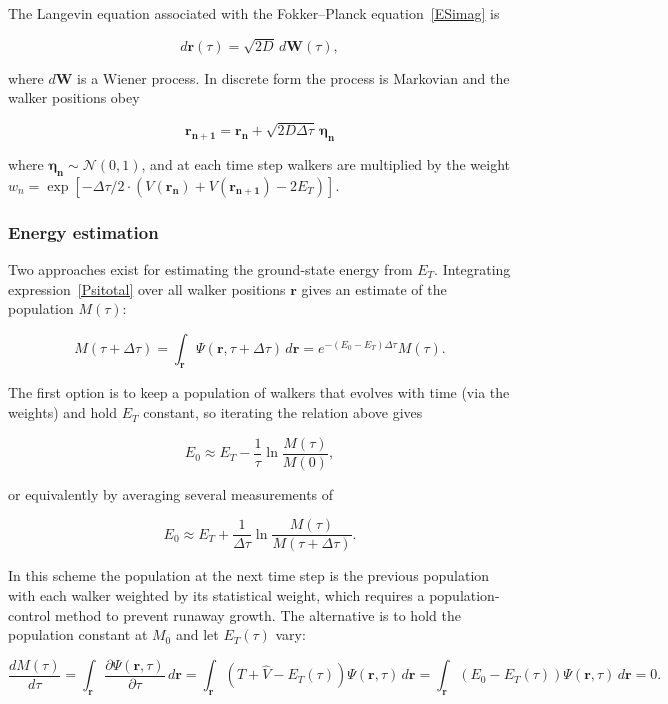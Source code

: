 \documentclass[11pt,a4paper,twoside,pdf]{article}
\numberwithin{equation}{section}
\begin{document}
The Langevin equation associated with the Fokker–Planck equation~\ref{ESimag}
is~\cite{van1992stochastic}

$$
    d \mathbf{r} (\tau) = \sqrt{2D}\, d \mathbf{W} (\tau),
$$

where $d\mathbf{W}$ is a Wiener process. In discrete form the process is Markovian
and the walker positions obey

\begin{equation}
    \mathbf{r_{n+1}} = \mathbf{r_n} + \sqrt{2D\Delta \tau}\, \boldsymbol{\eta_n}
\label{langevindmcpuro}
\end{equation}

where $\boldsymbol{\eta_n} \sim \mathcal{N}(0, 1)$, and at each time step walkers
are multiplied by the weight
$w_n = \exp \left[ - \Delta \tau / 2 \cdot ( V(\mathbf{r_n}) + V(\mathbf{r_{n+1}})- 2E_T) \right]$.


\subsubsection{Energy estimation}

Two approaches exist for estimating the ground-state energy from $E_T$. Integrating
expression~\ref{Psitotal} over all walker positions $\mathbf{r}$ gives an estimate
of the population $M(\tau)$:

$$
    M(\tau + \Delta \tau) = \int_{\mathbf{r}} \Psi(\mathbf{r}, \tau + \Delta \tau)\, d\mathbf{r} = e^{-(E_0 - E_T)\Delta \tau} M(\tau).
$$

The first option is to keep a population of walkers that evolves with time
(via the weights) and hold $E_T$ constant, so iterating the relation above gives

$$
    E_0 \approx E_T - \frac{1}{\tau} \ln \frac{M(\tau)}{M(0)},
$$

or equivalently by averaging several measurements of

$$
    E_0 \approx E_T + \frac{1}{\Delta \tau} \ln \frac{M(\tau)}{M(\tau + \Delta \tau)}.
$$

\newpage
In this scheme the population at the next time step is the previous population with
each walker weighted by its statistical weight, which requires a population-control
method to prevent runaway growth. The alternative is to hold the population
constant at $M_0$ and let $E_T(\tau)$ vary:

$$
    \frac{d M(\tau)}{d\tau} = \int_{\mathbf{r}} \frac{\partial \Psi (\mathbf{r}, \tau)}{\partial \tau}\, d\mathbf{r} =  \int_{\mathbf{r}} (\hat{T} + \hat{V} - E_T (\tau)) \Psi (\mathbf{r}, \tau)\, d\mathbf{r} = \int_{\mathbf{r}} (E_0 - E_T(\tau)) \Psi (\mathbf{r}, \tau)\, d\mathbf{r} = 0.
$$
\end{document}
